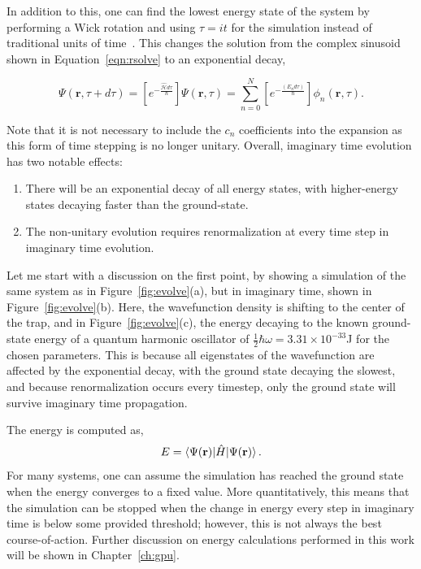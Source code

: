 In addition to this, one can find the lowest energy state of the system by performing a Wick rotation and using $\tau = it$ for the simulation instead of traditional units of time~\cite{wick1954}.
This changes the solution from the complex sinusoid shown in Equation~\eqref{eqn:rsolve} to an exponential decay,

\begin{equation}
\Psi(\mathbf{r},\tau + d\tau) = \left[e^{-\frac{\mathcal{\hat{H}}d\tau}{\hbar}}\right]\Psi(\mathbf{r},\tau) = \sum_{n=0}^N\left[e^{-\frac{(E_n d\tau)}{\hbar}}\right]\phi_n(\mathbf{r},\tau).
\end{equation}

\noindent Note that it is not necessary to include the $c_n$ coefficients into the expansion as this form of time stepping is no longer unitary.
Overall, imaginary time evolution has two notable effects:
\begin{enumerate}
\item There will be an exponential decay of all energy states, with higher-energy states decaying faster than the ground-state.
\item The non-unitary evolution requires renormalization at every time step in imaginary time evolution.
\end{enumerate}
Let me start with a discussion on the first point, by showing a simulation of the same system as in Figure~\ref{fig:evolve}(a), but in imaginary time, shown in Figure~\ref{fig:evolve}(b).
Here, the wavefunction density is shifting to the center of the trap, and
in Figure~\ref{fig:evolve}(c), the energy decaying to the known ground-state energy of a quantum harmonic oscillator of $\frac{1}{2}\hbar\omega = 3.31\times 10^{-33}$J for the chosen parameters.
This is because all eigenstates of the wavefunction are affected by the exponential decay, with the ground state decaying the slowest, and because renormalization occurs every timestep, only the ground state will survive imaginary time propagation.

The energy is computed as,
\begin{equation}
E = \braket{\Psi(\mathbf{r})|\hat H|\Psi(\mathbf{r})}.
\label{eqn:energy}
\end{equation}
For many systems, one can assume the simulation has reached the ground state when the energy converges to a fixed value.
More quantitatively, this means that the simulation can be stopped when the change in energy every step in imaginary time is below some provided threshold; however, this is not always the best course-of-action.
Further discussion on energy calculations performed in this work will be shown in Chapter~\ref{ch:gpu}.


